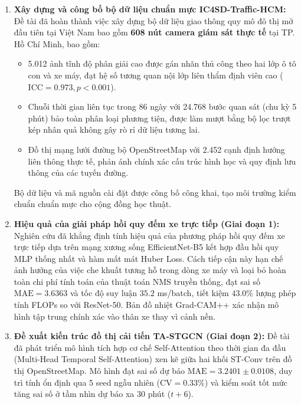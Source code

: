 \begin{enumerate}
    \item \textbf{Xây dựng và công bố bộ dữ liệu chuẩn mực IC4SD-Traffic-HCM:} 
    Đề tài đã hoàn thành việc xây dựng bộ dữ liệu giao thông quy mô đô thị mở đầu tiên tại Việt Nam bao gồm \textbf{608 nút camera giám sát thực tế} tại TP. Hồ Chí Minh, bao gồm:
    \begin{itemize}
        \item 5.012 ảnh tĩnh độ phân giải cao được gán nhãn thủ công theo hai lớp ô tô con và xe máy, đạt hệ số tương quan nội lớp liên thẩm định viên cao ($\text{ICC} = 0.973, p < 0.001$).
        \item Chuỗi thời gian liên tục trong 86 ngày với 24.768 bước quan sát (chu kỳ 5 phút) bảo toàn phân loại phương tiện, được làm mượt bằng bộ lọc trượt kép nhân quả không gây rò rỉ dữ liệu tương lai.
        \item Đồ thị mạng lưới đường bộ OpenStreetMap với 2.452 cạnh định hướng liên thông thực tế, phản ánh chính xác cấu trúc hình học và quy định lưu thông của các tuyến đường.
    \end{itemize}
    Bộ dữ liệu và mã nguồn cài đặt được công bố công khai, tạo môi trường kiểm chuẩn chuẩn mực cho cộng đồng học thuật.

    \item \textbf{Hiệu quả của giải pháp hồi quy đếm xe trực tiếp (Giai đoạn 1):} 
    Nghiên cứu đã khẳng định tính hiệu quả của phương pháp hồi quy đếm xe trực tiếp dựa trên mạng xương sống EfficientNet-B5 kết hợp đầu hồi quy MLP thống nhất và hàm mất mát Huber Loss. Cách tiếp cận này hạn chế ảnh hưởng của việc che khuất tương hỗ trong dòng xe máy và loại bỏ hoàn toàn chi phí tính toán của thuật toán NMS truyền thống, đạt sai số $\text{MAE} = 3.6363$ và tốc độ suy luận $35.2$ ms/batch, tiết kiệm $43.0\%$ lượng phép tính FLOPs so với ResNet-50. Bản đồ nhiệt Grad-CAM++ xác nhận mô hình tập trung chính xác vào thân xe thay vì cảnh nền.

    \item \textbf{Đề xuất kiến trúc đồ thị cải tiến TA-STGCN (Giai đoạn 2):} 
    Đề tài đã phát triển mô hình tích hợp cơ chế Self-Attention theo thời gian đa đầu (Multi-Head Temporal Self-Attention) xen kẽ giữa hai khối ST-Conv trên đồ thị OpenStreetMap. Mô hình đạt sai số dự báo $\text{MAE} = 3.2401 \pm 0.0108$, duy trì tính ổn định qua 5 seed ngẫu nhiên ($\text{CV} = 0.33\%$) và kiểm soát tốt mức tăng sai số ở tầm nhìn dự báo xa 30 phút ($t+6$).


\end{enumerate}
